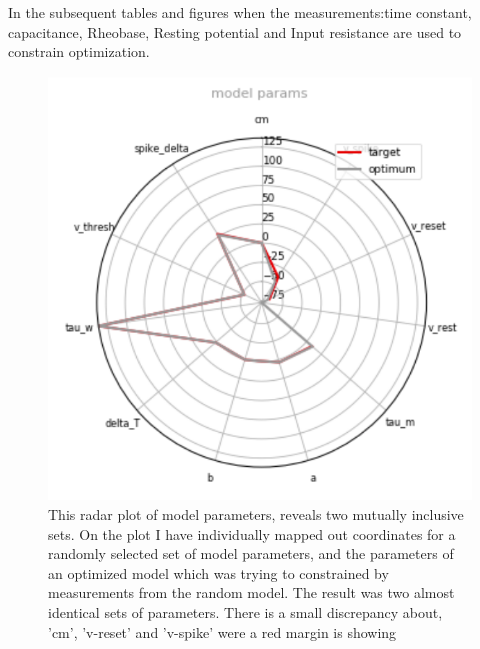 In the subsequent tables and figures when the measurements:time constant, capacitance, Rheobase, Resting potential and Input resistance are used to constrain optimization.
\begin{figure}
    \centering
    \includegraphics[scale=0.75]{figures/radar_coordinates.png}
    \caption{This radar plot of model parameters, reveals two mutually inclusive sets. On the plot I have individually mapped out coordinates for a randomly selected set of model parameters, and the parameters of an optimized model which was trying to constrained by measurements from the random model. The result was two almost identical sets of parameters. There is a small discrepancy about, 'cm', 'v-reset' and 'v-spike' were a red margin is showing}
    \label{fig:my_label}
\end{figure}




